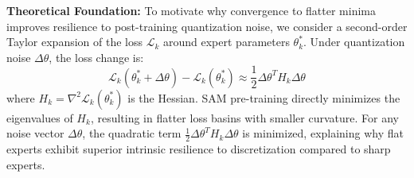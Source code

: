 \textbf{Theoretical Foundation:}
To motivate why convergence to flatter minima improves resilience to post-training quantization noise, we consider a second-order Taylor expansion of the loss $\mathcal{L}_k$ around expert parameters $\theta_k^*$. Under quantization noise $\Delta \theta$, the loss change is:
\begin{equation}
\label{eq:taylor_loss}
\mathcal{L}_k(\theta_k^* + \Delta \theta) - \mathcal{L}_k(\theta_k^*) \approx \frac{1}{2} \Delta \theta^T H_k \Delta \theta
\end{equation}
where $H_k = \nabla^2 \mathcal{L}_k(\theta_k^*)$ is the Hessian. SAM pre-training directly minimizes the eigenvalues of $H_k$, resulting in flatter loss basins with smaller curvature. For any noise vector $\Delta \theta$, the quadratic term $\frac{1}{2} \Delta \theta^T H_k \Delta \theta$ is minimized, explaining why flat experts exhibit superior intrinsic resilience to discretization compared to sharp experts.

